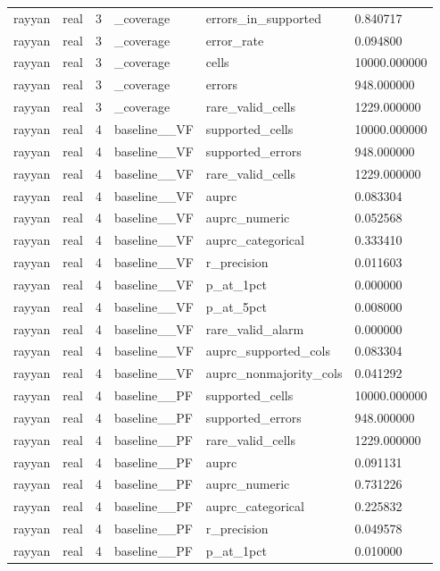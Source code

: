 \begin{tabular}{llllll}
rayyan & real & 3 & \_coverage & errors\_in\_supported & 0.840717 \\
rayyan & real & 3 & \_coverage & error\_rate & 0.094800 \\
rayyan & real & 3 & \_coverage & cells & 10000.000000 \\
rayyan & real & 3 & \_coverage & errors & 948.000000 \\
rayyan & real & 3 & \_coverage & rare\_valid\_cells & 1229.000000 \\
rayyan & real & 4 & baseline\_\_VF & supported\_cells & 10000.000000 \\
rayyan & real & 4 & baseline\_\_VF & supported\_errors & 948.000000 \\
rayyan & real & 4 & baseline\_\_VF & rare\_valid\_cells & 1229.000000 \\
rayyan & real & 4 & baseline\_\_VF & auprc & 0.083304 \\
rayyan & real & 4 & baseline\_\_VF & auprc\_numeric & 0.052568 \\
rayyan & real & 4 & baseline\_\_VF & auprc\_categorical & 0.333410 \\
rayyan & real & 4 & baseline\_\_VF & r\_precision & 0.011603 \\
rayyan & real & 4 & baseline\_\_VF & p\_at\_1pct & 0.000000 \\
rayyan & real & 4 & baseline\_\_VF & p\_at\_5pct & 0.008000 \\
rayyan & real & 4 & baseline\_\_VF & rare\_valid\_alarm & 0.000000 \\
rayyan & real & 4 & baseline\_\_VF & auprc\_supported\_cols & 0.083304 \\
rayyan & real & 4 & baseline\_\_VF & auprc\_nonmajority\_cols & 0.041292 \\
rayyan & real & 4 & baseline\_\_PF & supported\_cells & 10000.000000 \\
rayyan & real & 4 & baseline\_\_PF & supported\_errors & 948.000000 \\
rayyan & real & 4 & baseline\_\_PF & rare\_valid\_cells & 1229.000000 \\
rayyan & real & 4 & baseline\_\_PF & auprc & 0.091131 \\
rayyan & real & 4 & baseline\_\_PF & auprc\_numeric & 0.731226 \\
rayyan & real & 4 & baseline\_\_PF & auprc\_categorical & 0.225832 \\
rayyan & real & 4 & baseline\_\_PF & r\_precision & 0.049578 \\
rayyan & real & 4 & baseline\_\_PF & p\_at\_1pct & 0.010000 \\

\end{tabular}
